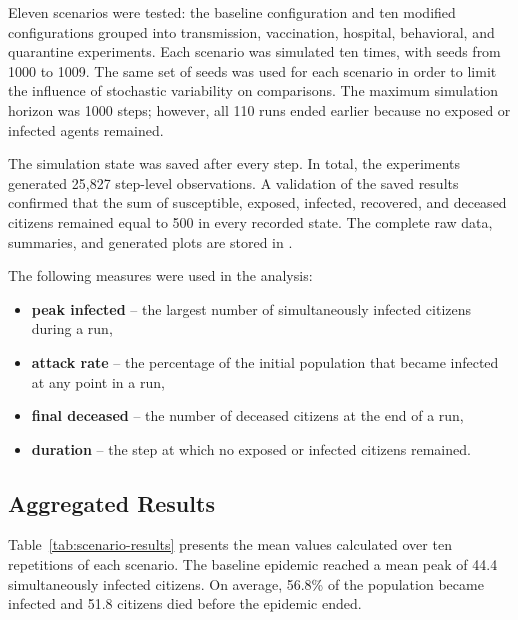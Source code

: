 \documentclass[english]{projectreport}
\begin{document}
Eleven scenarios were tested: the baseline configuration and ten modified
configurations grouped into transmission, vaccination, hospital,
behavioral, and quarantine experiments. Each scenario was simulated ten
times, with seeds from 1000 to 1009. The same set of seeds was used for
each scenario in order to limit the influence of stochastic variability
on comparisons. The maximum simulation horizon was 1000 steps; however,
all 110 runs ended earlier because no exposed or infected agents
remained.

The simulation state was saved after every step. In total, the
experiments generated 25,827 step-level observations. A validation of the
saved results confirmed that the sum of susceptible, exposed, infected,
recovered, and deceased citizens remained equal to 500 in every recorded
state. The complete raw data, summaries, and generated plots are stored
in .

The following measures were used in the analysis:
\begin{itemize}
\item \textbf{peak infected} -- the largest number of simultaneously
  infected citizens during a run,
\item \textbf{attack rate} -- the percentage of the initial population
  that became infected at any point in a run,
\item \textbf{final deceased} -- the number of deceased citizens at the
  end of a run,
\item \textbf{duration} -- the step at which no exposed or infected
  citizens remained.
\end{itemize}

\subsection{Aggregated Results}
\label{sec:experiments-aggregated}

Table~\ref{tab:scenario-results} presents the mean values calculated
over ten repetitions of each scenario. The baseline epidemic reached a
mean peak of 44.4 simultaneously infected citizens. On average, 56.8\%
of the population became infected and 51.8 citizens died before the
epidemic ended.
\end{document}
